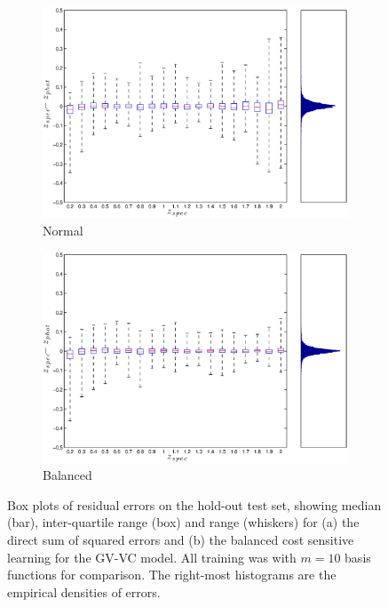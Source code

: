 \documentclass[useAMS,usenatbib,fleqn]{mn2e}
\begin{document}
\begin{figure}
        \centering
        \begin{subfigure}[b]{\columnwidth}
                \includegraphics[width=\textwidth]{figures/Zspec-Zphot_normal.eps}
                \caption{Normal}
                \label{fig-normal}
        \end{subfigure}	
        \begin{subfigure}[b]{\columnwidth}
                \includegraphics[width=\textwidth]{figures/Zspec-Zphot_balanced.eps}
                \caption{Balanced}
                \label{fig-balanced}
        \end{subfigure}
       \caption{Box plots of residual errors on the hold-out test set, showing median (bar), inter-quartile range (box) and range (whiskers) for (a) the direct sum of squared errors and (b) the balanced cost sensitive learning for the GV-VC model. All training was with $m=10$ basis functions for comparison. The right-most histograms are the empirical densities of errors.}
	\label{fig-normal-balanced}
\end{figure}
\end{document}
